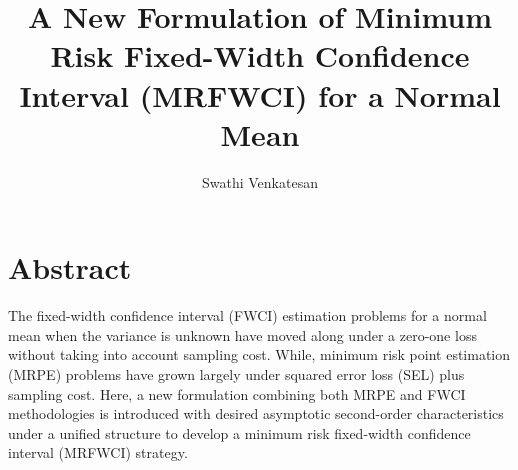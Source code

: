 \documentclass[12pt]{article}
\title{A New Formulation of Minimum Risk Fixed-Width Confidence Interval (MRFWCI) for a Normal Mean}
\author{Swathi Venkatesan}
\date{}
\begin{document}
\maketitle
\section*{Abstract}
The fixed-width confidence interval (FWCI) estimation problems for a 
normal mean when the variance is unknown have moved along under a zero-one 
loss without taking into account sampling cost. While, minimum risk point estimation (MRPE) problems 
have grown largely under squared error loss (SEL) plus sampling cost. Here, a new formulation combining
both MRPE and FWCI methodologies is introduced with desired asymptotic second-order characteristics 
under a unified structure to develop a minimum risk fixed-width confidence interval (MRFWCI) strategy.
\end{document}

